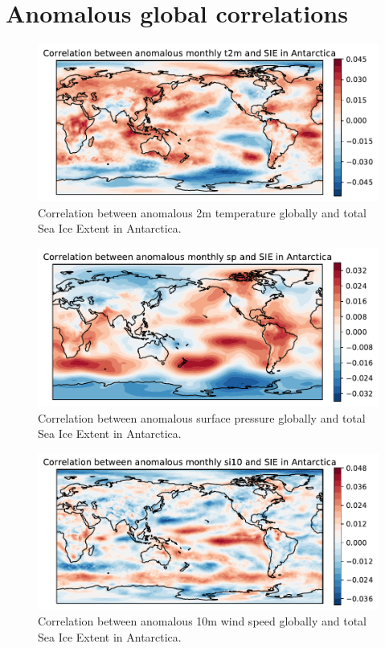 \section{Anomalous global correlations}
\begin{figure}[H]
    \centering
    \includegraphics[width=\textwidth]{Images/global_correlation_anomalous_monthly_t2m_sie.pdf}
    \caption{Correlation between anomalous 2m temperature globally and total Sea Ice Extent in Antarctica.}
    \label{fig:t2m_anomalous_sie_corr}
\end{figure}
\begin{figure}[H]
    \centering
    \includegraphics[width=\textwidth]{Images/global_correlation_anomalous_monthly_sp_sie.pdf}
    \caption{Correlation between anomalous surface pressure globally and total Sea Ice Extent in Antarctica.}
    \label{fig:sp_anomalous_sie_corr}
\end{figure}
\begin{figure}[H]
    \centering
    \includegraphics[width=\textwidth]{Images/global_correlation_anomalous_monthly_si10_sie.pdf}
    \caption{Correlation between anomalous 10m wind speed globally and total Sea Ice Extent in Antarctica.}
    \label{fig:si10_anomalous_sie_corr}
\end{figure}

